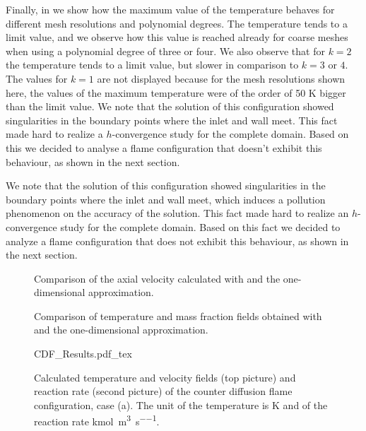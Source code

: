 Finally, in  we show how the maximum value of the temperature behaves for different mesh resolutions and polynomial degrees. The temperature tends to a limit value, and we observe how this value is reached already for coarse meshes when using a polynomial degree of three or four. We also observe that for $k=2$ the temperature tends to a limit value, but slower in comparison to $k =3$ or $4$. The values for $k=1$ are not displayed because for the mesh resolutions shown here, the values of the maximum temperature were of the order of 50 \si{K} bigger than the limit value. We note that the solution of this configuration showed singularities in the boundary points where the inlet and wall meet. This fact made hard to realize a $h$-convergence study for the complete domain. Based on this we decided to analyse a flame configuration that doesn't exhibit this behaviour, as shown in the next section.


We note that the solution of this configuration showed singularities in the boundary points where the inlet and wall meet, which induces a pollution phenomenon on the accuracy of the solution. This fact made hard to realize an $h$-convergence study for the complete domain. Based on this fact we decided to analyze a flame configuration that does not exhibit this behaviour, as shown in the next section.
\begin{figure}[t!]
	\centering
	\caption{ Comparison of the axial velocity calculated with \BoSSS and the one-dimensional approximation. }
	\label{fig:BoSSS_1D_Comparison_velocity}
\end{figure}
\newpage
\tikzexternaldisable
\begin{figure}[b!]
	\centering
	\caption{Comparison of temperature and mass fraction fields obtained with \BoSSS and the one-dimensional approximation.}
	\label{fig:BoSSS_1D_Comparison}
\end{figure}
\tikzexternalenable
\newpage
\begin{figure}[b]
	\begin{center}
		\def\svgwidth{0.8\textwidth}
		{CDF_Results.pdf_tex}		
\caption{Calculated temperature and velocity fields (top picture) and reaction rate (second picture) of the counter diffusion flame configuration, case (a). The unit of the temperature is \si{K} and of the reaction rate \si{\kilo\mole \per \meter \cubed \per \second}. }
	\label{fig:TempAndReacFields}
	\end{center}	
\end{figure} 

